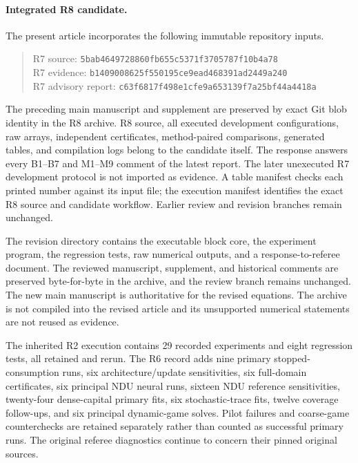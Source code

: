\begin{appendix}
\paragraph*{Integrated R8 candidate.}
The present article incorporates the following immutable repository inputs.
\begin{quote}\small
R7 source: \texttt{5bab4649\allowbreak 728860fb\allowbreak 655c5371\allowbreak f3705787\allowbreak f10b4a78}\\
R7 evidence: \texttt{b1409008\allowbreak 625f5501\allowbreak 95ce9ead\allowbreak 468391ad\allowbreak 2449a240}\\
R7 advisory report: \texttt{c63f6817\allowbreak f498e1cf\allowbreak e9a65313\allowbreak 9f7a25bf\allowbreak 44a4418a}
\end{quote}
The preceding main manuscript and supplement are preserved by exact Git blob identity in the R8 archive. R8 source, all executed development configurations, raw arrays, independent certificates, method-paired comparisons, generated tables, and compilation logs belong to the candidate itself. The response answers every B1--B7 and M1--M9 comment of the latest report. The later unexecuted R7 development protocol is not imported as evidence. A table manifest checks each printed number against its input file; the execution manifest identifies the exact R8 source and candidate workflow. Earlier review and revision branches remain unchanged.

The revision directory contains the executable block core, the experiment program, the regression tests, raw numerical outputs, and a response-to-referee document. The reviewed manuscript, supplement, and historical comments are preserved byte-for-byte in the archive, and the review branch remains unchanged. The new main manuscript is authoritative for the revised equations. The archive is not compiled into the revised article and its unsupported numerical statements are not reused as evidence.

The inherited R2 execution contains 29 recorded experiments and eight regression tests, all retained and rerun. The R6 record adds nine primary stopped-consumption runs, six architecture/update sensitivities, six full-domain certificates, six principal NDU neural runs, sixteen NDU reference sensitivities, twenty-four dense-capital primary fits, six stochastic-trace fits, twelve coverage follow-ups, and six principal dynamic-game solves. Pilot failures and coarse-game counterchecks are retained separately rather than counted as successful primary runs. The original referee diagnostics continue to concern their pinned original sources.


\end{appendix}
